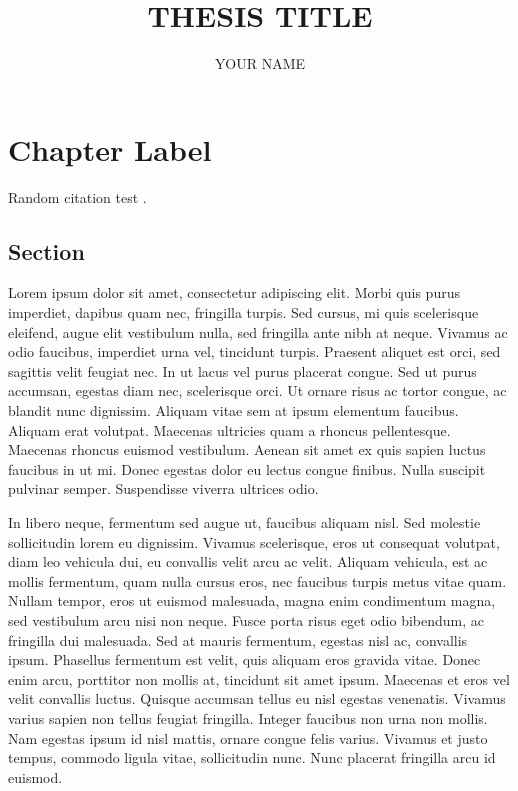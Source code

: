 \documentclass[draft]{yorkUThesisTemplate}
\title{THESIS TITLE}
\author{YOUR NAME}
\begin{document}
\makefrontmatter
\formatmainmatter

\chapter{Chapter Label}

Random citation test \cite{einstein}.

\section{Section}

Lorem ipsum dolor sit amet, consectetur adipiscing elit. Morbi quis purus imperdiet, dapibus quam nec, fringilla turpis. Sed cursus, mi quis scelerisque eleifend, augue elit vestibulum nulla, sed fringilla ante nibh at neque. Vivamus ac odio faucibus, imperdiet urna vel, tincidunt turpis. Praesent aliquet est orci, sed sagittis velit feugiat nec. In ut lacus vel purus placerat congue. Sed ut purus accumsan, egestas diam nec, scelerisque orci. Ut ornare risus ac tortor congue, ac blandit nunc dignissim. Aliquam vitae sem at ipsum elementum faucibus. Aliquam erat volutpat. Maecenas ultricies quam a rhoncus pellentesque. Maecenas rhoncus euismod vestibulum. Aenean sit amet ex quis sapien luctus faucibus in ut mi. Donec egestas dolor eu lectus congue finibus. Nulla suscipit pulvinar semper. Suspendisse viverra ultrices odio.

In libero neque, fermentum sed augue ut, faucibus aliquam nisl. Sed molestie sollicitudin lorem eu dignissim. Vivamus scelerisque, eros ut consequat volutpat, diam leo vehicula dui, eu convallis velit arcu ac velit. Aliquam vehicula, est ac mollis fermentum, quam nulla cursus eros, nec faucibus turpis metus vitae quam. Nullam tempor, eros ut euismod malesuada, magna enim condimentum magna, sed vestibulum arcu nisi non neque. Fusce porta risus eget odio bibendum, ac fringilla dui malesuada. Sed at mauris fermentum, egestas nisl ac, convallis ipsum. Phasellus fermentum est velit, quis aliquam eros gravida vitae. Donec enim arcu, porttitor non mollis at, tincidunt sit amet ipsum. Maecenas et eros vel velit convallis luctus. Quisque accumsan tellus eu nisl egestas venenatis. Vivamus varius sapien non tellus feugiat fringilla. Integer faucibus non urna non mollis. Nam egestas ipsum id nisl mattis, ornare congue felis varius. Vivamus et justo tempus, commodo ligula vitae, sollicitudin nunc. Nunc placerat fringilla arcu id euismod.
\end{document}
